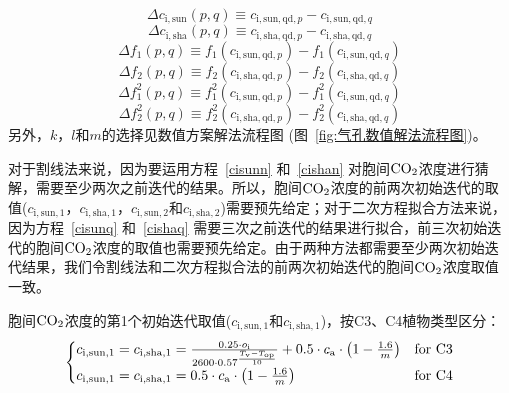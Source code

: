 \begin{equation}
\Delta c_{\mathrm{i,sun}}(p,q)\equiv c_{\mathrm{i,sun,qd},p} - c_{\mathrm{i,sun,qd},q}
\end{equation}
\begin{equation}
\Delta c_{\mathrm{i,sha}}(p,q)\equiv c_{\mathrm{i,sha,qd},p} - c_{\mathrm{i,sha,qd},q}
\end{equation}
\begin{equation}
\Delta f_1 \left(p,q\right)\equiv f_1(c_{\mathrm{i,sun,qd},p})-f_1(c_{\mathrm{i,sun,qd},q})
\end{equation}
\begin{equation}
\Delta f_2 \left(p,q\right)\equiv f_2(c_{\mathrm{i,sha,qd},p})-f_2(c_{\mathrm{i,sha,qd},q})
\end{equation}
\begin{equation}
\Delta f^2_1 \left(p,q\right)\equiv f^2_1(c_{\mathrm{i,sun,qd},p})-f^2_1(c_{\mathrm{i,sun,qd},q})
\end{equation}
\begin{equation}
\Delta f^2_2 \left(p,q\right)\equiv f^2_2(c_{\mathrm{i,sha,qd},p})-f^2_2(c_{\mathrm{i,sha,qd},q})
\end{equation}
另外，$k$，$l$和$m$的选择见数值方案解法流程图 (图~\ref{fig:气孔数值解法流程图})。

对于割线法来说，因为要运用方程~\eqref{cisunn} 和~\eqref{cishan} 对胞间$\rm CO_2$浓度进行猜解，需要至少两次之前迭代的结果。所以，胞间$\rm CO_2$浓度的前两次初始迭代的取值($c_{\mathrm{i,sun,1}}$，$c_{\mathrm{i,sha,1}}$，$c_{\mathrm{i,sun,2}}$和$c_{\mathrm{i,sha,2}}$)需要预先给定；对于二次方程拟合方法来说，因为方程~\eqref{cisunq} 和~\eqref{cishaq} 需要三次之前迭代的结果进行拟合，前三次初始迭代的胞间$\rm CO_2$浓度的取值也需要预先给定。由于两种方法都需要至少两次初始迭代结果，我们令割线法和二次方程拟合法的前两次初始迭代的胞间$\rm CO_2$浓度取值一致。

胞间$\rm CO_2$浓度的第1个初始迭代取值($c_{\mathrm{i,sun,1}}$和$c_{\mathrm{i,sha,1}}$)，按C3、C4植物类型区分：
\begin{align}\label{ci_1}
\begin{cases}
c_{\mathrm{i,sun,1}}=c_{\mathrm{i,sha,1}}=\frac{0.25 \cdot o_{\mathrm{i}}} {2600 \cdot 0.57 ^\frac{T_{\mathrm{{v }}} -  T_{\mathrm{o p}}}{10}} + 0.5\cdot c_{\mathrm{a}}\cdot\left(1-\frac{1.6}{m}\right) &\rm for\,\, C3\\
c_{\mathrm{i,sun,1}}=c_{\mathrm{i,sha,1}}=0.5\cdot c_{\mathrm{a}}\cdot\left(1-\frac{1.6}{m}\right)   &\rm for\,\, C4
\end{cases}
\end{align}

